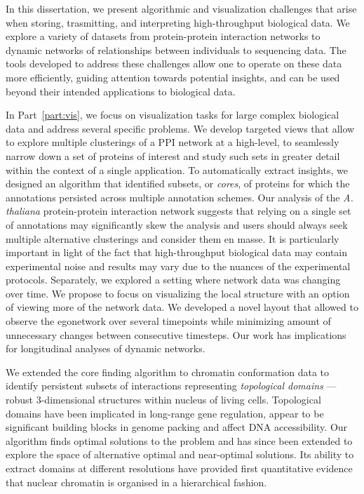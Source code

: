 \documentclass[12pt]{cmuthesis}
\begin{document}

In this dissertation, we present algorithmic and visualization challenges that arise when storing, trasmitting, and interpreting high-throughput biological data. We explore a variety of datasets from protein-protein interaction networks to dynamic networks of relationships between individuals to sequencing data. The tools developed to address these challenges allow one to operate on these data more efficiently, guiding attention towards potential insights, and can be used beyond their intended applications to biological data.

In Part~\ref{part:vis}, we focus on visualization tasks for large complex biological data and address several specific problems. We develop targeted views that allow to explore multiple clusterings of a PPI network at a high-level, to seamlessly narrow down a set of proteins of interest and study such sets in greater detail within the context of a single application. To automatically extract insights, we designed an algorithm that identified subsets, or \textit{cores}, of proteins for which the annotations persisted across multiple annotation schemes. 
Our analysis of the \textit{A. thaliana} protein-protein interaction network suggests that relying on a single set of annotations may significantly skew the analysis and users should always seek multiple alternative clusterings and consider them en masse. It is particularly important in light of the fact that high-throughput biological data may contain experimental noise and results may vary due to the nuances of the experimental protocols.
Separately, we explored a setting where network data was changing over time. We propose to focus on visualizing the local structure with an option of viewing more of the network data. We developed a novel layout that allowed to observe the egonetwork over several timepoints while minimizing amount of unnecessary changes between consecutive timesteps. Our work has implications for longitudinal analyses of dynamic networks.

We extended the core finding algorithm to chromatin conformation data to identify persistent subsets of interactions representing \textit{topological domains} --- robust 3-dimensional structures within nucleus of living cells. Topological domains have been implicated in long-range gene regulation, appear to be significant building blocks in genome packing and affect DNA accessibility. Our algorithm finds optimal solutions to the problem and has since been extended to explore the space of alternative optimal and near-optimal solutions. Its ability to extract domains at different resolutions have provided first quantitative evidence that nuclear chromatin is organised in a hierarchical fashion.
\end{document}
